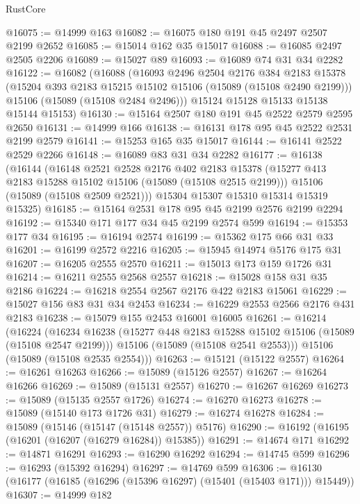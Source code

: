 \begin{lexlean}{RustCore}
\begin{coremodule}
@16075 := @14999 @163
@16082 := @16075 @180 @191 @45 @2497 @2507 @2199 @2652
@16085 := @15014 @162 @35 @15017
@16088 := @16085 @2497 @2505 @2206
@16089 := @15027 @89
@16093 := @16089 @74 @31 @34 @2282
@16122 := @16082
    (@16088
      (@16093
        @2496
        @2504
        @2176
        @384
        @2183
        @15378
        (@15204 @393 @2183 @15215 @15102 @15106 (@15089 (@15108 @2490 @2199)))
        @15106
        (@15089 (@15108 @2484 @2496)))
      @15124
      @15128
      @15133
      @15138
      @15144
      @15153)
@16130 := @15164 @2507 @180 @191 @45 @2522 @2579 @2595 @2650
@16131 := @14999 @166
@16138 := @16131 @178 @95 @45 @2522 @2531 @2199 @2579
@16141 := @15253 @165 @35 @15017
@16144 := @16141 @2522 @2529 @2266
@16148 := @16089 @83 @31 @34 @2282
@16177 := @16138
    (@16144
      (@16148
        @2521
        @2528
        @2176
        @402
        @2183
        @15378
        (@15277 @413 @2183 @15288 @15102 @15106 (@15089 (@15108 @2515 @2199)))
        @15106
        (@15089 (@15108 @2509 @2521)))
      @15304
      @15307
      @15310
      @15314
      @15319
      @15325)
@16185 := @15164 @2531 @178 @95 @45 @2199 @2576 @2199 @2294
@16192 := @15340 @171 @177 @34 @45 @2199 @2574 @599
@16194 := @15353 @177 @34
@16195 := @16194 @2574
@16199 := @15362 @175 @66 @31 @33
@16201 := @16199 @2572 @2216
@16205 := @15945 @14974 @5176 @175 @31
@16207 := @16205 @2555 @2570
@16211 := @15013 @173 @159 @1726 @31
@16214 := @16211 @2555 @2568 @2557
@16218 := @15028 @158 @31 @35 @2186
@16224 := @16218 @2554 @2567 @2176 @422 @2183 @15061
@16229 := @15027 @156 @83 @31 @34 @2453
@16234 := @16229 @2553 @2566 @2176 @431 @2183
@16238 := @15079 @155 @2453 @16001 @16005
@16261 := @16214
    (@16224
      (@16234
        @16238
        (@15277 @448 @2183 @15288 @15102 @15106 (@15089 (@15108 @2547 @2199)))
        @15106
        (@15089 (@15108 @2541 @2553)))
      @15106
      (@15089 (@15108 @2535 @2554)))
@16263 := @15121 (@15122 @2557)
@16264 := @16261 @16263
@16266 := @15089 (@15126 @2557)
@16267 := @16264 @16266
@16269 := @15089 (@15131 @2557)
@16270 := @16267 @16269
@16273 := @15089 (@15135 @2557 @1726)
@16274 := @16270 @16273
@16278 := @15089 (@15140 @173 @1726 @31)
@16279 := @16274 @16278
@16284 := @15089 (@15146 (@15147 (@15148 @2557)) @5176)
@16290 := @16192 (@16195 (@16201 (@16207 (@16279 @16284)) @15385))
@16291 := @14674 @171
@16292 := @14871 @16291
@16293 := @16290 @16292
@16294 := @14745 @599
@16296 := @16293 (@15392 @16294)
@16297 := @14769 @599
@16306 := @16130 (@16177 (@16185 (@16296 (@15396 @16297) (@15401 (@15403 @171))) @15449))
@16307 := @14999 @182

\end{coremodule}
\end{lexlean}
